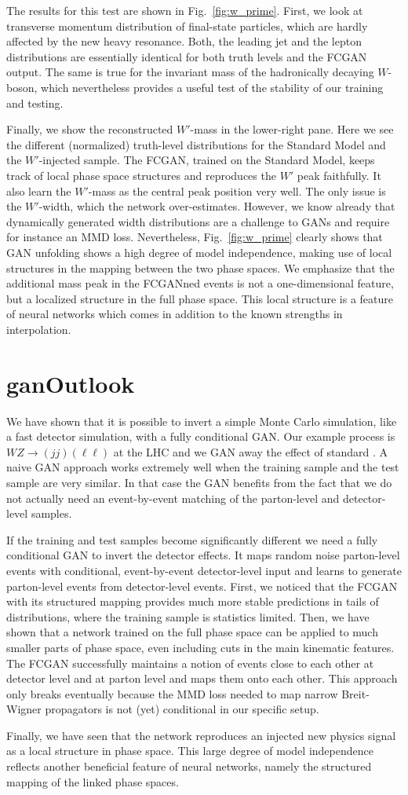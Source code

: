 The results for this test are shown in Fig.~\ref{fig:w_prime}. First,
we look at transverse momentum distribution of final-state particles,
which are hardly affected by the new heavy resonance. Both, the
leading jet and the lepton distributions are essentially identical for
both truth levels and the FCGAN output. The same is true for the
invariant mass of the hadronically decaying $W$-boson, which
nevertheless provides a useful test of the stability of our training
and testing.

Finally, we show the reconstructed $W'$-mass in the lower-right
pane. Here we see the different (normalized) truth-level distributions
for the Standard Model and the $W'$-injected sample. The FCGAN,
trained on the Standard Model, keeps track of local phase space
structures and reproduces the $W'$ peak faithfully. It also learn the
$W'$-mass as the central peak position very well. The only issue is
the $W'$-width, which the network over-estimates. However, we know
already that dynamically generated width distributions are a challenge
to GANs and require for instance an MMD loss.  Nevertheless,
Fig.~\ref{fig:w_prime} clearly shows that GAN unfolding shows a high
degree of model independence, making use of local structures in the
mapping between the two phase spaces. We emphasize that the additional
mass peak in the FCGANned events is not a one-dimensional feature, but
a localized structure in the full phase space. This local structure is
a feature of neural networks which comes in addition to the known
strengths in interpolation.

\section{ganOutlook}
We have shown that it is possible to invert a simple Monte Carlo
simulation, like a fast detector simulation, with a fully conditional
GAN. Our example process is $WZ \to (jj) (\ell \ell)$ at the LHC and
we GAN away the effect of standard \delphes. A naive GAN approach
works extremely well when the training sample and the test sample are
very similar. In that case the GAN benefits from the fact that we do
not actually need an event-by-event matching of the parton-level and
detector-level samples.

If the training and test samples become significantly different we
need a fully conditional GAN to invert the detector effects. It maps
random noise parton-level events with conditional, event-by-event
detector-level input and learns to generate parton-level events from
detector-level events.  First, we noticed that the FCGAN with its
structured mapping provides much more stable predictions in tails of
distributions, where the training sample is statistics limited.  Then,
we have shown that a network trained on the full phase space can be
applied to much smaller parts of phase space, even including cuts in
the main kinematic features. The FCGAN successfully maintains a notion
of events close to each other at detector level and at parton level
and maps them onto each other. This approach only breaks eventually
because the MMD loss needed to map narrow Breit-Wigner propagators is
not (yet) conditional in our specific setup.

Finally, we have seen that the network reproduces an injected new
physics signal as a local structure in phase space. This large degree
of model independence reflects another beneficial feature of neural
networks, namely the structured mapping of the linked phase spaces.

%
